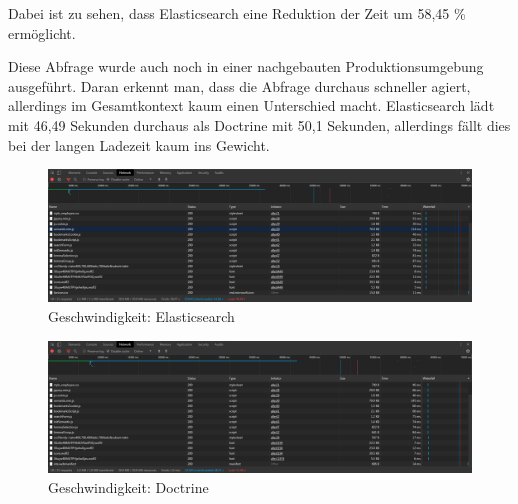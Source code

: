 Dabei ist zu sehen, dass Elasticsearch eine Reduktion der Zeit um 58,45 \% ermöglicht.

Diese Abfrage wurde auch noch in einer nachgebauten Produktionsumgebung ausgeführt. Daran erkennt man, dass die Abfrage durchaus schneller agiert, allerdings im Gesamtkontext kaum einen Unterschied macht. Elasticsearch lädt mit 46,49 Sekunden durchaus als Doctrine mit 50,1 Sekunden, allerdings fällt dies bei der langen Ladezeit kaum ins Gewicht.


\begin{figure}
	\centering
	\includegraphics[width=1\linewidth]{images/setup/query/time_prod_ela.png}
	\caption{Geschwindigkeit: Elasticsearch}
	\label{img:timeProdEla}
\end{figure}

\begin{figure}
	\centering
	\includegraphics[width=1\linewidth]{images/setup/query/time_prod_db.png}
	\caption{Geschwindigkeit: Doctrine}
	\label{img:timeProdDb}
\end{figure}


